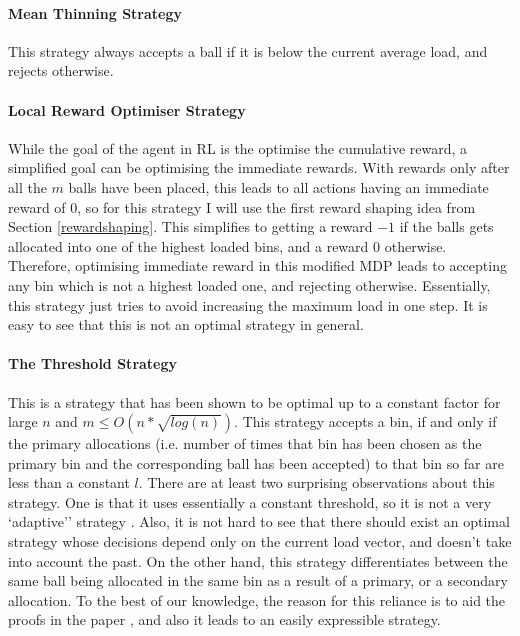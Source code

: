 \paragraph{Mean Thinning Strategy}
This strategy always accepts a ball if it is below the current average load, and rejects otherwise. 


\paragraph{Local Reward Optimiser Strategy}

While the goal of the agent in RL is the optimise the cumulative reward, a simplified goal can be optimising the immediate rewards. With rewards only after all the $m$ balls have been placed, this leads to all actions having an immediate reward of $0$, so for this strategy I will use the first reward shaping idea from Section \ref{rewardshaping}. This simplifies to getting a reward $-1$ if the balls gets allocated into one of the highest loaded bins, and a reward $0$ otherwise. Therefore, optimising immediate reward in this modified MDP leads to accepting any bin which is not a highest loaded one, and rejecting otherwise. Essentially, this strategy just tries to avoid increasing the maximum load in one step. It is easy to see that this is not an optimal strategy in general. 

\paragraph{The Threshold Strategy} 

This is a strategy that has been shown to be optimal  \cite{feldheim2021thinning} up to a constant factor for large $n$ and $m\leq O(n*\sqrt{log(n)})$. This strategy accepts a bin, if and only if the primary allocations (i.e. number of times that bin has been chosen as the primary bin and the corresponding ball has been accepted) to that bin so far are less than a constant $l$. There are at least two surprising observations about this strategy. One is that it uses essentially a constant threshold, so it is not a very `adaptive'' strategy . Also, it is not hard to see that there should exist an optimal strategy whose decisions depend only on the current load vector, and doesn't take into account the past. On the other hand, this strategy differentiates between the same ball being allocated in the same bin as a result of a primary, or a secondary allocation. To the best of our knowledge, the reason for this reliance is to aid the proofs in the paper \cite{feldheim2021thinning}, and also it leads to an easily expressible strategy. 

